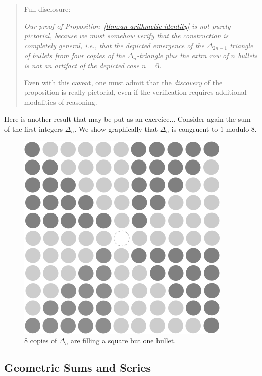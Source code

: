 \begin{quote}
Full disclosure: {\em Our proof of
  Proposition~\ref{thm:an-arithmetic-identity} is not {\em purely}
  pictorial, because we must somehow verify that the construction is
  completely general, i.e., that the depicted emergence of the
  $\Delta_{2n-1}$ triangle of bullets from four copies of the
  $\Delta_n$-triangle plus the extra row of $n$ bullets is not an
  artifact of the depicted case $n =6$.

Even with this caveat, one must admit that the {\em discovery} of the
proposition is really pictorial, even if the verification requires
additional modalities of reasoning. }
\end{quote}

{\Denis Here is another result that may be put as an exercice...}
Consider again the sum of the first integers $\Delta_n$. 
We show graphically that $\Delta_n$ is congruent to $1$ modulo $8$.
\begin{figure}[ht]
\begin{center}
       \includegraphics[scale=0.4]{FiguresMaths/Delta8}
\caption{8 copies of $\Delta_n$ are filling a square but one bullet.}
       \label{fig:Sum8deltas}
\end{center}
\end{figure}

\subsection{Geometric Sums and Series}
\label{sec:geometric-sums}


